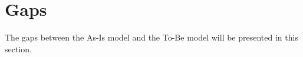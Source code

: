 \section{Gaps}
\label{sec:gaps}
The gaps between the As-Is model and the To-Be model will be presented in this section.
